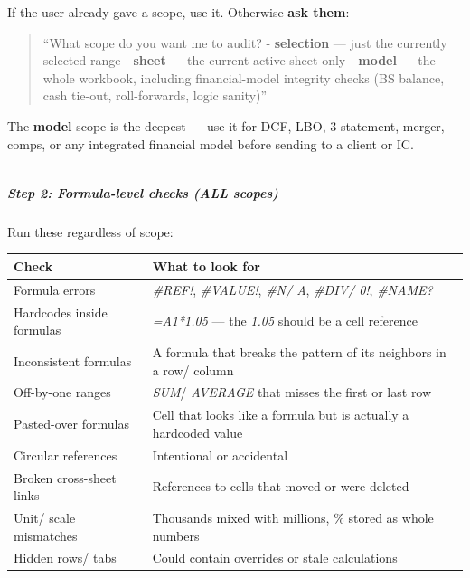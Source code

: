 \documentclass[11pt]{article}
\begin{document}
If the user already gave a scope, use it. Otherwise \textbf{ask them}:


\begin{quote}
``What scope do you want me to audit? - \textbf{selection} — just the currently selected range - \textbf{sheet} — the current active sheet only - \textbf{model} — the whole workbook, including financial-model integrity checks (BS balance, cash tie-out, roll-forwards, logic sanity)''
\end{quote}

The \textbf{model} scope is the deepest — use it for DCF, LBO, 3-statement, merger, comps, or any integrated financial model before sending to a client or IC.


\vspace{0.5em}\hrule\vspace{0.5em}

\subparagraph{Step 2: Formula-level checks (ALL scopes)}\mbox{}\par

Run these regardless of scope:


\begingroup
\small
\setlength{\tabcolsep}{2pt}
\begin{longtable}{>{\RaggedRight\arraybackslash\hspace{0pt}}p{}>{\RaggedRight\arraybackslash\hspace{0pt}}p{}}
\toprule
{} \textbf{Check} & \textbf{What to look for} \\
\midrule
{} Formula errors & \emph{\#REF!}, \emph{\#VALUE!}, \emph{\#N/ A}, \emph{\#DIV/ 0!}, \emph{\#NAME?} \\
{} Hardcodes inside formulas & \emph{=A1*1.05} — the \emph{1.05} should be a cell reference \\
{} Inconsistent formulas & A formula that breaks the pattern of its neighbors in a row/ column \\
{} Off-by-one ranges & \emph{SUM}/ \emph{AVERAGE} that misses the first or last row \\
{} Pasted-over formulas & Cell that looks like a formula but is actually a hardcoded value \\
{} Circular references & Intentional or accidental \\
{} Broken cross-sheet links & References to cells that moved or were deleted \\
{} Unit/ scale mismatches & Thousands mixed with millions, \% stored as whole numbers \\
{} Hidden rows/ tabs & Could contain overrides or stale calculations \\
\bottomrule
\end{longtable}
\endgroup
\end{document}
